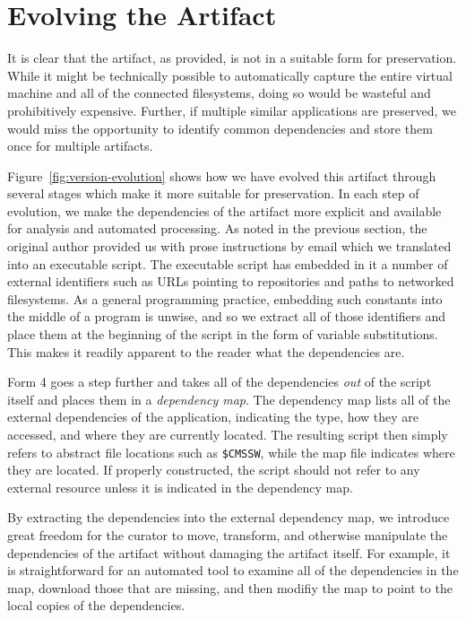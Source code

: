 \documentclass{sig-alternate}
\begin{document}
\fi

\section{Evolving the Artifact}

It is clear that the artifact, as provided, is not in a suitable form
for preservation.  While it might be technically possible to automatically
capture the entire virtual machine and all of the connected filesystems,
doing so would be wasteful and prohibitively expensive.  Further, if multiple
similar applications are preserved, we would miss the opportunity to identify
common dependencies and store them once for multiple artifacts.

Figure~\ref{fig:version-evolution} shows how we have evolved this artifact
through several stages which make it more suitable for preservation.
In each step of evolution, we make the dependencies of the artifact
more explicit and available for analysis and automated processing.
As noted in the previous section, the original author provided us with
prose instructions by email which we translated into an
executable script.  The executable script has embedded in it
a number of external identifiers such as URLs pointing to repositories
and paths to networked filesystems.  As a general programming practice,
embedding such constants into the middle of a program is unwise, and so
we extract all of those identifiers and place them at the beginning
of the script in the form of variable substitutions.  This makes
it readily apparent to the reader what the dependencies are.

Form 4 goes a step further and takes all of the dependencies \emph{out}
of the script itself and places them in a \emph{dependency map}.
The dependency map lists all of the external dependencies of the application, indicating
the type, how they are accessed, and where they are currently located.
The resulting script then simply refers to abstract file locations such
as \verb!$CMSSW!, while the map file indicates where they are located.
If properly constructed, the script should not refer to any external
resource unless it is indicated in the dependency map.

By extracting the dependencies into the external dependency map,
we introduce great freedom for the curator to move, transform, and otherwise
manipulate the dependencies of the artifact without damaging the artifact itself.
For example, it is straightforward for an automated tool to examine
all of the dependencies in the map, download those that are missing,
and then modifiy the map to point to the local copies of the dependencies.
\end{document}
